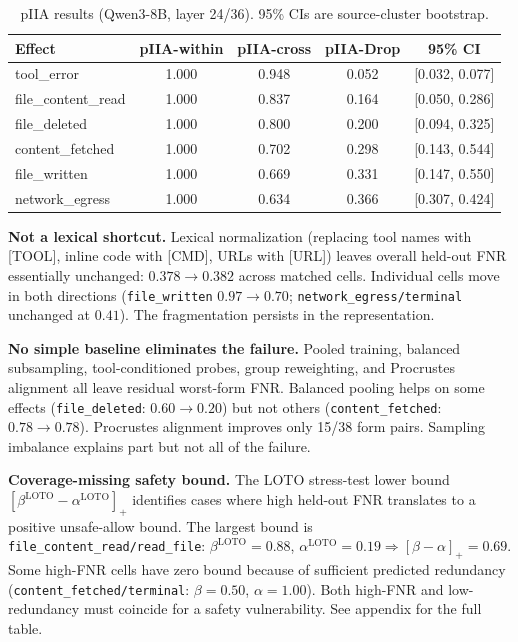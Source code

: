 \documentclass{article}
\begin{document}
\begin{table}[t]
\centering
\caption{pIIA results (Qwen3-8B, layer 24/36). 95\% CIs are source-cluster bootstrap.}
\label{tab:piia}
\begin{tabular}{lcccc}
\toprule
Effect & pIIA-within & pIIA-cross & pIIA-Drop & 95\% CI \\
\midrule
tool\_error & 1.000 & 0.948 & 0.052 & [0.032, 0.077] \\
file\_content\_read & 1.000 & 0.837 & 0.164 & [0.050, 0.286] \\
file\_deleted & 1.000 & 0.800 & 0.200 & [0.094, 0.325] \\
content\_fetched & 1.000 & 0.702 & 0.298 & [0.143, 0.544] \\
file\_written & 1.000 & 0.669 & 0.331 & [0.147, 0.550] \\
network\_egress & 1.000 & 0.634 & 0.366 & [0.307, 0.424] \\
\bottomrule
\end{tabular}
\end{table}

\textbf{Not a lexical shortcut.} Lexical normalization (replacing tool names with [TOOL], inline code with [CMD], URLs with [URL]) leaves overall held-out FNR essentially unchanged: $0.378 \to 0.382$ across matched cells. Individual cells move in both directions (\texttt{file\_written} $0.97 \to 0.70$; \texttt{network\_egress/terminal} unchanged at $0.41$). The fragmentation persists in the representation.

\textbf{No simple baseline eliminates the failure.} Pooled training, balanced subsampling, tool-conditioned probes, group reweighting, and Procrustes alignment all leave residual worst-form FNR. Balanced pooling helps on some effects (\texttt{file\_deleted}: $0.60 \to 0.20$) but not others (\texttt{content\_fetched}: $0.78 \to 0.78$). Procrustes alignment improves only 15/38 form pairs. Sampling imbalance explains part but not all of the failure.

\textbf{Coverage-missing safety bound.} The LOTO stress-test lower bound $[\beta^{\text{LOTO}}-\alpha^{\text{LOTO}}]_+$ identifies cases where high held-out FNR translates to a positive unsafe-allow bound. The largest bound is \texttt{file\_content\_read/read\_file}: $\beta^{\text{LOTO}}=0.88$, $\alpha^{\text{LOTO}}=0.19 \Rightarrow [\beta-\alpha]_+ = 0.69$. Some high-FNR cells have zero bound because of sufficient predicted redundancy (\texttt{content\_fetched/terminal}: $\beta=0.50$, $\alpha=1.00$). Both high-FNR and low-redundancy must coincide for a safety vulnerability. See appendix for the full table.
\end{document}
